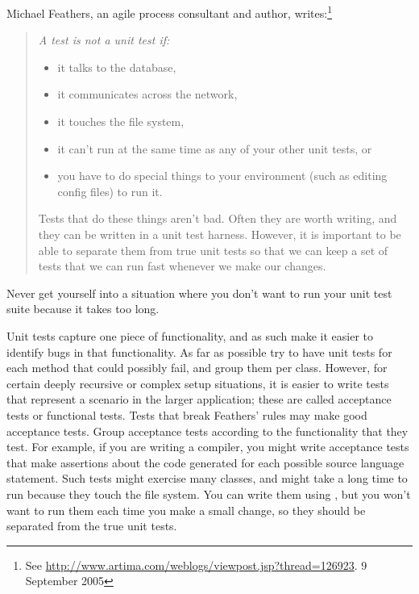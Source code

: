 \documentclass[a4paper,10pt,twoside]{book}
\begin{document}
{\begin{description}
\item[Feathers' Rules for Unit tests.]
  Michael Feathers, an  agile process consultant and author, writes:\footnote{See \url{http://www.artima.com/weblogs/viewpost.jsp?thread=126923}. 9 September 2005} 
  \begin{quotation}
  \noindent
  {\it
  A test is not a unit test if:
  \begin{itemize}
	\item it talks to the database,
	\item it communicates across the network,
	\item it touches the file system,
	\item it can't run at the same time as any of your other unit tests, or
	\item you have to do special things to your environment (such as editing config files) to run it.
 \end{itemize}
Tests that do these things aren't bad. Often they are worth writing, and they can be written in a unit test harness. However, it is important to be able to separate them from true unit tests so that we can keep a set of tests that we can run fast whenever we make our changes.
 }
  \end{quotation}
Never get yourself into a situation where you don't want to run your unit test suite because it takes too long.   
 
\item[Unit Tests \textit{vs.}\ Acceptance Tests.] Unit tests capture one piece of
  functionality, and as such make it easier to identify bugs in that functionality.
  As far as
  possible try to have unit tests for each method that could possibly fail, and group them per class.
  However,
  for certain deeply recursive or complex setup situations, it is
  easier to write tests that represent a scenario in the larger application; these are called acceptance 
  tests or functional tests.
  Tests that break Feathers' rules may make good acceptance tests.
  Group acceptance tests according to the functionality that they test.
  For example, if you are writing a compiler, you might write acceptance tests that make 
  assertions about the code generated for each possible source language statement.
  Such tests might exercise many classes, and might take a long time to run because they touch the 
  file system.
  You can write them using \sunit, but you won't want to run them each time you make a small change,
  so they should be separated from the true unit tests.
 

\end{description}}
\end{document}
